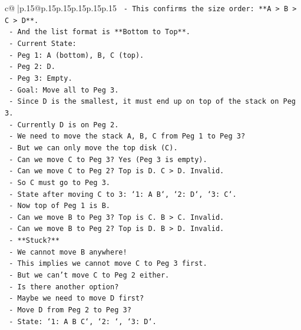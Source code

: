 \documentclass{article}
\begin{document}
{\begin{supertabular}{c@{$\;$}|p{.15\linewidth}@{}p{.15\linewidth}p{.15\linewidth}p{.15\linewidth}p{.15\linewidth}p{.15\linewidth}}
{{{\texttt{            {-} This confirms the size order: **A > B > C > D**.} \\
\texttt{            {-} And the list format is **Bottom to Top**.} \\
\texttt{            {-} Current State:} \\
\texttt{              {-} Peg 1: A (bottom), B, C (top).} \\
\texttt{              {-} Peg 2: D.} \\
\texttt{              {-} Peg 3: Empty.} \\
\texttt{            {-} Goal: Move all to Peg 3.} \\
\texttt{            {-} Since D is the smallest, it must end up on top of the stack on Peg 3.} \\
\texttt{            {-} Currently D is on Peg 2.} \\
\texttt{            {-} We need to move the stack A, B, C from Peg 1 to Peg 3?} \\
\texttt{            {-} But we can only move the top disk (C).} \\
\texttt{            {-} Can we move C to Peg 3? Yes (Peg 3 is empty).} \\
\texttt{            {-} Can we move C to Peg 2? Top is D. C > D. Invalid.} \\
\texttt{            {-} So C must go to Peg 3.} \\
\texttt{            {-} State after moving C to 3: `1: A B`, `2: D`, `3: C`.} \\
\texttt{            {-} Now top of Peg 1 is B.} \\
\texttt{            {-} Can we move B to Peg 3? Top is C. B > C. Invalid.} \\
\texttt{            {-} Can we move B to Peg 2? Top is D. B > D. Invalid.} \\
\texttt{            {-} **Stuck?**} \\
\texttt{            {-} We cannot move B anywhere!} \\
\texttt{            {-} This implies we cannot move C to Peg 3 first.} \\
\texttt{            {-} But we can't move C to Peg 2 either.} \\
\texttt{            {-} Is there another option?} \\
\texttt{            {-} Maybe we need to move D first?} \\
\texttt{            {-} Move D from Peg 2 to Peg 3?} \\
\texttt{            {-} State: `1: A B C`, `2: `, `3: D`.} \\
}}}
\end{supertabular}}
\end{document}

